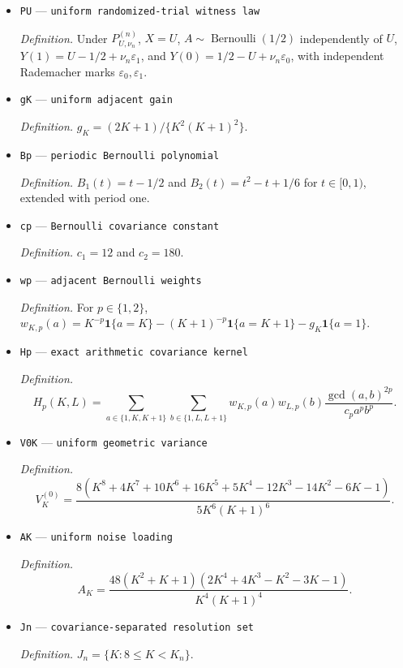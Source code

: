 \documentclass{article}
\begin{document}
\begin{itemize}
  \par\smallskip\noindent\emph{Definition.} A deterministic sequence \(\nu_n\in[0,1/4]\).
  \item \texttt{PU} --- \texttt{uniform randomized-\allowbreak{}trial witness law}
  \par\smallskip\noindent\emph{Definition.} Under \(P_{U,\nu_n}^{(n)}\), \(X=U\), \(A\sim\operatorname{Bernoulli}(1/2)\) independently of \(U\), \(Y(1)=U-1/2+\nu_n\varepsilon_1\), and \(Y(0)=1/2-U+\nu_n\varepsilon_0\), with independent Rademacher marks \(\varepsilon_0,\varepsilon_1\).
  \item \texttt{gK} --- \texttt{uniform adjacent gain}
  \par\smallskip\noindent\emph{Definition.} \(g_K=(2K+1)/\{K^2(K+1)^2\}\).
  \item \texttt{Bp} --- \texttt{periodic Bernoulli polynomial}
  \par\smallskip\noindent\emph{Definition.} \(B_1(t)=t-1/2\) and \(B_2(t)=t^2-t+1/6\) for \(t\in[0,1)\), extended with period one.
  \item \texttt{cp} --- \texttt{Bernoulli covariance constant}
  \par\smallskip\noindent\emph{Definition.} \(c_1=12\) and \(c_2=180\).
  \item \texttt{wp} --- \texttt{adjacent Bernoulli weights}
  \par\smallskip\noindent\emph{Definition.} For \(p\in\{1,2\}\), \(w_{K,p}(a)=K^{-p}\mathbf 1\{a=K\}-(K+1)^{-p}\mathbf 1\{a=K+1\}-g_K\mathbf 1\{a=1\}\).
  \item \texttt{Hp} --- \texttt{exact arithmetic covariance kernel}
  \par\smallskip\noindent\emph{Definition.} \[H_p(K,L)=\sum_{a\in\{1,K,K+1\}}\sum_{b\in\{1,L,L+1\}}w_{K,p}(a)w_{L,p}(b)\frac{\gcd(a,b)^{2p}}{c_p a^p b^p}.\]
  \item \texttt{V0K} --- \texttt{uniform geometric variance}
  \par\smallskip\noindent\emph{Definition.} \[V_K^{(0)}=\frac{8(K^8+4K^7+10K^6+16K^5+5K^4-12K^3-14K^2-6K-1)}{5K^6(K+1)^6}.\]
  \item \texttt{AK} --- \texttt{uniform noise loading}
  \par\smallskip\noindent\emph{Definition.} \[A_K=\frac{48(K^2+K+1)(2K^4+4K^3-K^2-3K-1)}{K^4(K+1)^4}.\]
  \item \texttt{Jn} --- \texttt{covariance-\allowbreak{}separated resolution set}
  \par\smallskip\noindent\emph{Definition.} \(J_n=\{K:8\le K<K_n\}\).

\end{itemize}
\end{document}
